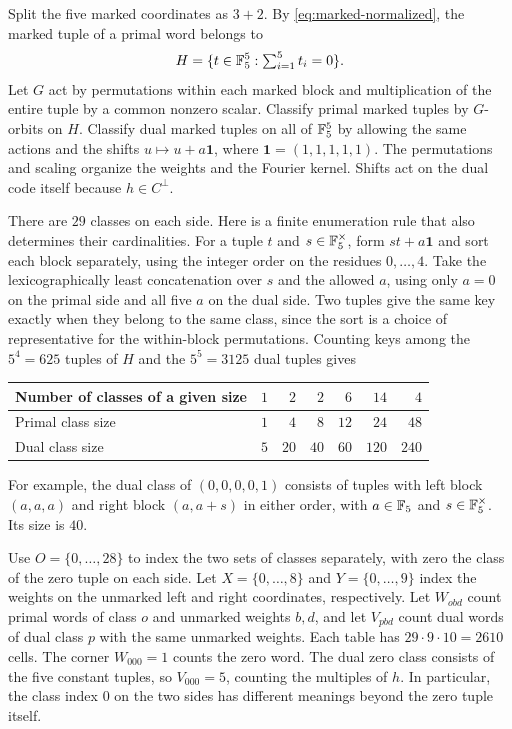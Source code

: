 Split the five marked coordinates as \(3+2\). By \eqref{eq:marked-normalized}, the marked tuple of a primal word belongs to
\[
 H=\{t\in\mathbb F_5^5:\textstyle\sum_{i=1}^5t_i=0\}.
\]
Let \(G\) act by permutations within each marked block and multiplication of the entire tuple by a common nonzero scalar. Classify primal marked tuples by \(G\)-orbits on \(H\). Classify dual marked tuples on all of \(\mathbb F_5^5\) by allowing the same actions and the shifts \(u\mapsto u+a\mathbf 1\), where \(\mathbf 1=(1,1,1,1,1)\). The permutations and scaling organize the weights and the Fourier kernel. Shifts act on the dual code itself because \(h\in C^\perp\).

There are \(29\) classes on each side. Here is a finite enumeration rule that also determines their cardinalities. For a tuple \(t\) and \(s\in\mathbb F_5^\times\), form \(s t+a\mathbf 1\) and sort each block separately, using the integer order on the residues \(0,\ldots,4\). Take the lexicographically least concatenation over \(s\) and the allowed \(a\), using only \(a=0\) on the primal side and all five \(a\) on the dual side. Two tuples give the same key exactly when they belong to the same class, since the sort is a choice of representative for the within-block permutations. Counting keys among the \(5^4=625\) tuples of \(H\) and the \(5^5=3125\) dual tuples gives
\begin{center}
\begin{tabular}{lrrrrrr}
\toprule
Number of classes of a given size & \(1\) & \(2\) & \(2\) & \(6\) & \(14\) & \(4\)\\
\midrule
Primal class size & \(1\) & \(4\) & \(8\) & \(12\) & \(24\) & \(48\)\\
Dual class size   & \(5\) & \(20\) & \(40\) & \(60\) & \(120\) & \(240\)\\
\bottomrule
\end{tabular}
\end{center}
For example, the dual class of \((0,0,0,0,1)\) consists of tuples with left block \((a,a,a)\) and right block \((a,a+s)\) in either order, with \(a\in\mathbb F_5\) and \(s\in\mathbb F_5^\times\). Its size is \(40\).

Use \(O=\{0,\ldots,28\}\) to index the two sets of classes separately, with zero the class of the zero tuple on each side. Let \(X=\{0,\ldots,8\}\) and \(Y=\{0,\ldots,9\}\) index the weights on the unmarked left and right coordinates, respectively. Let \(W_{obd}\) count primal words of class \(o\) and unmarked weights \(b,d\), and let \(V_{pbd}\) count dual words of dual class \(p\) with the same unmarked weights. Each table has \(29\cdot9\cdot10=2610\) cells. The corner \(W_{000}=1\) counts the zero word. The dual zero class consists of the five constant tuples, so \(V_{000}=5\), counting the multiples of \(h\). In particular, the class index \(0\) on the two sides has different meanings beyond the zero tuple itself.

